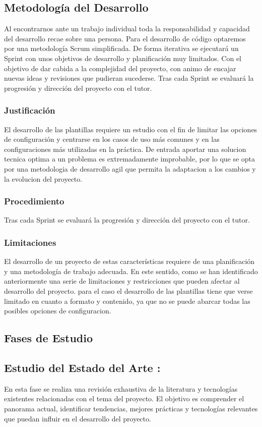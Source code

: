 \documentclass[12pt, a4paper, twoside]{article}
\begin{document}
\subsection{Metodología del Desarrollo}
Al encontrarnos ante un trabajo individual toda la responsabilidad y capacidad del desarrollo recae sobre una persona. 
Para el desarrollo de código optaremos por una metodología Scrum simplificada. De forma iterativa se ejecutará un Sprint con 
unos objetivos de desarrollo y planificación muy limitados. Con el objetivo de dar cabida a la complejidad del proyecto, 
con animo de encajar nuevas ideas y revisiones que pudieran sucederse.
Tras cada Sprint se evaluará la progresión y dirección del proyecto con el tutor.
\subsubsection{Justificación}

El desarrollo de las plantillas requiere un estudio con el fin de limitar las opciones de configuración y centrarse en los casos de uso más comunes y en las configuraciones más utilizadas en la práctica.
De entrada aportar una solucion tecnica optima a un problema es extremadamente improbable, por lo que se opta por una metodologia de desarrollo agil que permita la adaptacion a los cambios y la evolucion del proyecto.
\subsubsection{Procedimiento}
Tras cada Sprint se evaluará la progresión y dirección del proyecto con el tutor. 
\subsubsection{Limitaciones}
El desarrollo de un proyecto de estas características requiere de una planificación y una metodología de trabajo adecuada.
En este sentido, como se han identificado anteriormente una serie de limitaciones y restricciones que pueden afectar al desarrollo del proyecto.
para el caso el desarrollo de las plantillas tiene que verse limitado en cuanto a formato y contenido, ya que no se puede abarcar todas las posibles opciones de configuracion.
\subsection{Fases de Estudio}
\subsection{Estudio del Estado del Arte :}
En esta fase se realiza una revisión exhaustiva de la literatura y tecnologías existentes relacionadas con el tema del 
proyecto. El objetivo es comprender el panorama actual, identificar tendencias, mejores prácticas y tecnologías 
relevantes que puedan influir en el desarrollo del proyecto.
\end{document}
